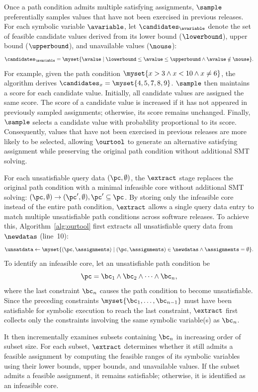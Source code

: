 Once a path condition admits multiple satisfying assignments, $\sample$ preferentially samples values that have not been exercised in previous releases. For each symbolic variable $\avariable$, let $\candidates_{\avariable}$ denote the set of feasible candidate values derived from its lower bound ($\lowerbound$), upper bound ($\upperbound$), and unavailable values ($\nouse$):
\[
\candidates_{\avariable}=
\myset{
\avalue
\mid
\lowerbound \le \avalue \le \upperbound
\land
\avalue \notin \nouse
}.
\]
For example, given the path condition $\myset{x>3 \land x<10 \land x\neq6}$, the algorithm derives $\candidates_x=\myset{4,5,7,8,9}$. $\sample$ then maintains a score for each candidate value. Initially, all candidate values are assigned the same score. The score of a candidate value is increased if it has not appeared in previously sampled assignments; otherwise, its score remains unchanged. Finally, $\sample$ selects a candidate value with probability proportional to its score. Consequently, values that have not been exercised in previous releases are more likely to be selected, allowing $\ourtool$ to generate an alternative satisfying assignment while preserving the original path condition without additional SMT solving.

For each unsatisfiable query data $(\pc,\emptyset)$, the $\extract$ stage replaces the original path condition with a minimal infeasible core without additional SMT solving: $(\pc,\emptyset)\rightarrow(\pc',\emptyset), \pc'\subseteq\pc$. By storing only the infeasible core instead of the entire path condition, $\extract$ allows a single query data entry to match multiple unsatisfiable path conditions across software releases. To achieve this, Algorithm~\ref{alg:ourtool} first extracts all unsatisfiable query data from $\newdatas$ (line~10):
\[
\unsatdata
\gets
\myset{
(\pc,\assignments)
\mid
(\pc,\assignments)\in\newdatas
\land
\assignments=\emptyset
}.
\]
To identify an infeasible core, let an unsatisfiable path condition be
\[
\pc=\bc_1\land\bc_2\land\cdots\land\bc_n,
\]
where the last constraint $\bc_n$ causes the path condition to become unsatisfiable. Since the preceding constraints
$\myset{\bc_1,\ldots,\bc_{n-1}}$
must have been satisfiable for symbolic execution to reach the last constraint, $\extract$ first collects only the constraints involving the same symbolic variable(s) as $\bc_n$. 

It then incrementally examines subsets containing $\bc_n$ in increasing order of subset size. For each subset, $\extract$ determines whether it still admits a feasible assignment by computing the feasible ranges of its symbolic variables using their lower bounds, upper bounds, and unavailable values. If the subset admits a feasible assignment, it remains satisfiable; otherwise, it is identified as an infeasible core.

